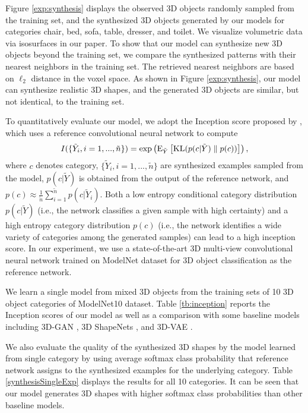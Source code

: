 \documentclass[10pt,twocolumn,letterpaper]{article}
\def\E{{\rm E}}
\def\KL{{\rm KL}}
\def\tY{\tilde{Y}}
\begin{document}
Figure \ref{exp:synthesis} displays the observed 3D objects randomly sampled from the training set, and the synthesized 3D objects generated by our models for categories chair, bed, sofa, table, dresser, and toilet. 
We visualize volumetric data via isosurfaces in our paper. To show that our model can synthesize new 3D objects beyond the training set, we compare the synthesized patterns with their nearest neighbors in the training set. The retrieved nearest neighbors are based on $\ell_2$ distance in the voxel space. As shown in Figure \ref{exp:synthesis}, our model can synthesize realistic 3D shapes, and the generated 3D objects are similar, but not identical, to the training set.  

To quantitatively evaluate our model, we adopt the Inception score proposed by \cite{warde2016improving}, which uses a reference convolutional neural network to compute  
\begin{eqnarray} 
I(\{\tY_i,i=1,...,\tilde{n}\})=\exp\left( \E_{\tY}\left[ \KL( p(c|\tY)\parallel p(c))\right]\right), \nonumber 
\end{eqnarray} 
where $c$ denotes category, $\{\tY_i,i=1,...,\tilde{n}\}$ are synthesized examples sampled from the model, $p(c|\tY)$ is obtained from the output of the reference network, and $p(c)
\approx \frac{1}{\tilde{n}} \sum_{i=1}^{\tilde{n}} p(c|\tY_i)$. Both a low entropy conditional category distribution $p(c|\tY)$ (i.e., the  network classifies a given sample with high certainty) and a high entropy category distribution $p(c)$ (i.e., the network identifies a wide variety of categories among the generated samples) can lead to a high inception score. In our experiment, we use a state-of-the-art 3D multi-view convolutional neural network \cite{qi2016volumetric} trained on ModelNet dataset for 3D object classification as the reference network.

We learn a single model from mixed 3D objects from the training sets of 10 3D object categories of ModelNet10 dataset.
Table \ref{tb:inception} reports the Inception scores of our model as well as a comparison with some baseline models including 3D-GAN \cite{3dgan}, 3D ShapeNets \cite{wu20153d}, and 3D-VAE \cite{kingma2013auto}.

We also evaluate the quality of the synthesized 3D shapes by the model learned from single category by using average softmax class probability that reference network assigns to the synthesized examples for the underlying category. 
Table \ref{synthesisSingleExp} displays the results for all 10 categories. It can be seen that our model generates 3D shapes with higher softmax class probabilities than other baseline models. 
\end{document}
